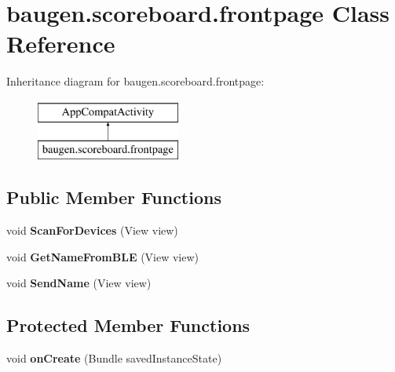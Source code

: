 \hypertarget{classbaugen_1_1scoreboard_1_1frontpage}{}\section{baugen.\+scoreboard.\+frontpage Class Reference}
\label{classbaugen_1_1scoreboard_1_1frontpage}
Inheritance diagram for baugen.\+scoreboard.\+frontpage\+:\begin{figure}[H]
\begin{center}
\leavevmode
\includegraphics[height=2.000000cm]{classbaugen_1_1scoreboard_1_1frontpage}
\end{center}
\end{figure}
\subsection*{Public Member Functions}
\begin{DoxyCompactItemize}
\item 
\hypertarget{classbaugen_1_1scoreboard_1_1frontpage_a48598abf3d67a58fe05f0ee3cf31dfab}{}\label{classbaugen_1_1scoreboard_1_1frontpage_a48598abf3d67a58fe05f0ee3cf31dfab} 
void {\bfseries Scan\+For\+Devices} (View view)
\item 
\hypertarget{classbaugen_1_1scoreboard_1_1frontpage_ae7525e866aa5946bec7e1440864c00f7}{}\label{classbaugen_1_1scoreboard_1_1frontpage_ae7525e866aa5946bec7e1440864c00f7} 
void {\bfseries Get\+Name\+From\+B\+LE} (View view)
\item 
\hypertarget{classbaugen_1_1scoreboard_1_1frontpage_abbb81a88e481fd4f4488252270c8450a}{}\label{classbaugen_1_1scoreboard_1_1frontpage_abbb81a88e481fd4f4488252270c8450a} 
void {\bfseries Send\+Name} (View view)
\end{DoxyCompactItemize}
\subsection*{Protected Member Functions}
\begin{DoxyCompactItemize}
\item 
\hypertarget{classbaugen_1_1scoreboard_1_1frontpage_a22f57438438c0fb3bcb1e5d04b999388}{}\label{classbaugen_1_1scoreboard_1_1frontpage_a22f57438438c0fb3bcb1e5d04b999388} 
void {\bfseries on\+Create} (Bundle saved\+Instance\+State)
\end{DoxyCompactItemize}
